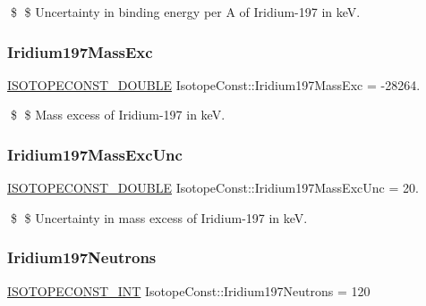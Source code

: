 \$ \$ Uncertainty in binding energy per A of Iridium-\/197 in keV. \mbox{\label{group___isotope_const-_iridium-_ir197_ga89e52981362df4d9a439eb72452ac3c4}} 
\subsubsection{\texorpdfstring{Iridium197\+Mass\+Exc}{Iridium197MassExc}}
{\footnotesize\ttfamily \mbox{\hyperlink{group___isotope_const-_macros_ga8f45a7272ce02c0b4c65c44636ed719a}{I\+S\+O\+T\+O\+P\+E\+C\+O\+N\+S\+T\+\_\+\+D\+O\+U\+B\+LE}} Isotope\+Const\+::\+Iridium197\+Mass\+Exc = -\/28264.}

\$ \$ Mass excess of Iridium-\/197 in keV. \mbox{\label{group___isotope_const-_iridium-_ir197_ga9e58a477ba9832a2647dac65c11b554b}} 
\subsubsection{\texorpdfstring{Iridium197\+Mass\+Exc\+Unc}{Iridium197MassExcUnc}}
{\footnotesize\ttfamily \mbox{\hyperlink{group___isotope_const-_macros_ga8f45a7272ce02c0b4c65c44636ed719a}{I\+S\+O\+T\+O\+P\+E\+C\+O\+N\+S\+T\+\_\+\+D\+O\+U\+B\+LE}} Isotope\+Const\+::\+Iridium197\+Mass\+Exc\+Unc = 20.}

\$ \$ Uncertainty in mass excess of Iridium-\/197 in keV. \mbox{\label{group___isotope_const-_iridium-_ir197_gad2482e251bf962048db7ad4bbe21f09f}} 
\subsubsection{\texorpdfstring{Iridium197\+Neutrons}{Iridium197Neutrons}}
{\footnotesize\ttfamily \mbox{\hyperlink{group___isotope_const-_macros_ga5f18360b3e99483a35c32d789e62621c}{I\+S\+O\+T\+O\+P\+E\+C\+O\+N\+S\+T\+\_\+\+I\+NT}} Isotope\+Const\+::\+Iridium197\+Neutrons = 120}

